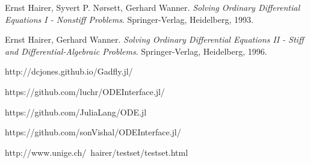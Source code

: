 \documentclass[notitlepage,12pt]{article}
\begin{document}




\begin{thebibliography}{9}
Ernst Hairer, Syvert P. N\o{}rsett, Gerhard Wanner. 
\textit{Solving Ordinary Differential Equations I - Nonstiff Problems}. 
Springer-Verlag, Heidelberg, 1993.

Ernst Hairer, Gerhard Wanner. 
\textit{Solving Ordinary Differential Equations II - Stiff and Differential-Algebraic Problems}. 
Springer-Verlag, Heidelberg, 1996.

http://dcjones.github.io/Gadfly.jl/

https://github.com/luchr/ODEInterface.jl/

https://github.com/JuliaLang/ODE.jl

https://github.com/sonVishal/ODEInterface.jl/

http://www.unige.ch/~hairer/testset/testset.html

\end{thebibliography}

\end{document}

